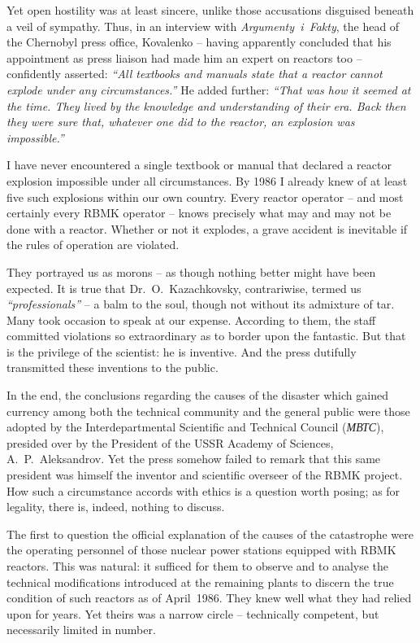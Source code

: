 \documentclass[openright]{bookest}
\begin{document}
Yet open hostility was at least sincere, unlike those accusations disguised beneath a veil of sympathy. Thus, in an interview with \textit{Argumenty~i~Fakty}, the head of the Chernobyl press office, Kovalenko -- having apparently concluded that his appointment as press liaison had made him an expert on reactors too -- confidently asserted: \textit{``All textbooks and manuals state that a reactor cannot explode under any circumstances.''} He added further: \textit{``That was how it seemed at the time. They lived by the knowledge and understanding of their era. Back then they were sure that, whatever one did to the reactor, an explosion was impossible.''}

I have never encountered a single textbook or manual that declared a reactor explosion impossible under all circumstances. By 1986 I already knew of at least five such explosions within our own country. Every reactor operator -- and most certainly every RBMK operator -- knows precisely what may and may not be done with a reactor. Whether or not it explodes, a grave accident is inevitable if the rules of operation are violated.

They portrayed us as morons -- as though nothing better might have been expected. It is true that Dr.~O.~Kazachkovsky, contrariwise, termed us \textit{``professionals''} -- a balm to the soul, though not without its admixture of tar. Many took occasion to speak at our expense. According to them, the staff committed violations so extraordinary as to border upon the fantastic. But that is the privilege of the scientist: he is inventive. And the press dutifully transmitted these inventions to the public.

In the end, the conclusions regarding the causes of the disaster which gained currency among both the technical community and the general public were those adopted by the Interdepartmental Scientific and Technical Council (\textit{МВТС}), presided over by the President of the USSR Academy of Sciences, A.~P.~Aleksandrov. Yet the press somehow failed to remark that this same president was himself the inventor and scientific overseer of the RBMK project. How such a circumstance accords with ethics is a question worth posing; as for legality, there is, indeed, nothing to discuss.


The first to question the official explanation of the causes of the catastrophe were the operating personnel of those nuclear power stations equipped with RBMK reactors. This was natural: it sufficed for them to observe and to analyse the technical modifications introduced at the remaining plants to discern the true condition of such reactors as of April~1986. They knew well what they had relied upon for years. Yet theirs was a narrow circle -- technically competent, but necessarily limited in number.
\end{document}
